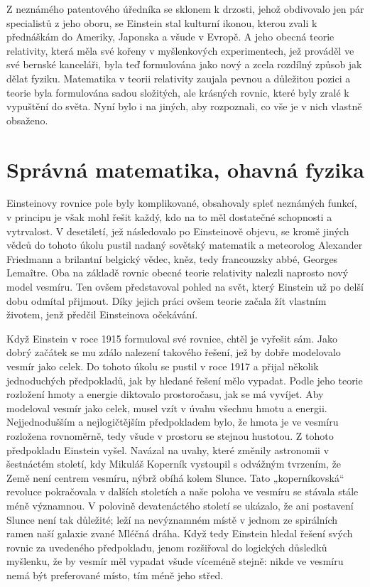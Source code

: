   Z neznámého patentového úředníka se sklonem k drzosti, jehož obdivovalo jen pár specialistů z jeho
  oboru, se Einstein stal kulturní ikonou, kterou zvali k přednáškám do Ameriky, Japonska a všude v
  Evropě. A jeho obecná teorie relativity, která měla své kořeny v myšlenkových experimentech, jež
  prováděl ve své bernské kanceláři, byla teď formulována jako nový a zcela rozdílný způsob jak
  dělat fyziku. Matematika v teorii relativity zaujala pevnou a důležitou pozici a teorie byla
  formulována sadou složitých, ale krásných rovnic, které byly zralé k vypuštění do světa. Nyní bylo
  i na jiných, aby rozpoznali, co vše je v nich vlastně obsaženo.

\section{Správná matematika, ohavná fyzika}\label{kulIchIIIsecIV} 
  Einsteinovy rovnice pole byly komplikované, obsahovaly spleť neznámých funkcí, v principu je však
  mohl řešit každý, kdo na to měl dostatečné schopnosti a vytrvalost. V desetiletí, jež následovalo
  po Einsteinově objevu, se kromě jiných vědců do tohoto úkolu pustil nadaný sovětský matematik a
  meteorolog Alexander Friedmann a brilantní belgický vědec, kněz, tedy francouzsky abbé, Georges
  Lemaître. Oba na základě rovnic obecné teorie relativity nalezli naprosto nový model vesmíru. Ten
  ovšem představoval pohled na svět, který Einstein už po delší dobu odmítal přijmout. Díky jejich
  práci ovšem teorie začala žít vlastním životem, jenž předčil Einsteinova očekávání. 
  
  Když Einstein v roce 1915 formuloval své rovnice, chtěl je vyřešit sám. Jako dobrý začátek se mu
  zdálo nalezení takového řešení, jež by dobře modelovalo vesmír jako celek. Do tohoto úkolu se
  pustil v roce 1917 a přijal několik jednoduchých předpokladů, jak by hledané řešení mělo vypadat.
  Podle jeho teorie rozložení hmoty a energie diktovalo prostoročasu, jak se má vyvíjet. Aby
  modeloval vesmír jako celek, musel vzít v úvahu všechnu hmotu a energii. Nejjednodušším a
  nejlogičtějším předpokladem bylo, že hmota je ve vesmíru rozložena rovnoměrně, tedy všude v
  prostoru se stejnou hustotou. Z tohoto předpokladu Einstein vyšel. Navázal na uvahy, které změnily
  astronomii v šestnáctém století, kdy Mikuláš Koperník vystoupil s odvážným tvrzením, že Země není
  centrem vesmíru, nýbrž obíhá kolem Slunce. Tato „koperníkovská“ revoluce pokračovala v dalších
  stoletích a naše poloha ve vesmíru se stávala stále méně významnou. V polovině devatenáctého
  století se ukázalo, že ani postavení Slunce není tak důležité; leží na nevýznamném místě v jednom
  ze spirálních ramen naší galaxie zvané Mléčná dráha. Když tedy Einstein hledal řešení svých rovnic
  za uvedeného předpokladu, jenom rozšiřoval do logických důsledků myšlenku, že by vesmír měl
  vypadat všude víceméně stejně: nikde ve vesmíru nemá být preferované místo, tím méně jeho střed.
    
